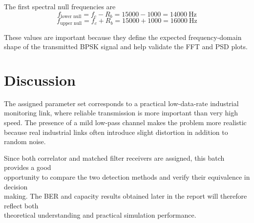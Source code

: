 The first spectral null frequencies are
\[
f_{\text{lower null}} = f_c - R_b = 15000 - 1000 = 14000~\text{Hz}
\]
\[
f_{\text{upper null}} = f_c + R_b = 15000 + 1000 = 16000~\text{Hz}
\]

These values are important because they define the expected frequency-domain shape of the transmitted BPSK signal and help validate the FFT and PSD plots.

\section{Discussion}
The assigned parameter set corresponds to a practical low-data-rate industrial monitoring link, where reliable transmission is more important than very high speed. 
The presence of a mild low-pass channel makes the problem more realistic because real industrial links often introduce slight distortion in addition to random noise.

Since both correlator and matched filter receivers are assigned, this batch provides a good \\opportunity to compare the two detection methods and verify their equivalence in decision \\making. 
The BER and capacity results obtained later in the report will therefore reflect both \\theoretical understanding and practical simulation performance.
